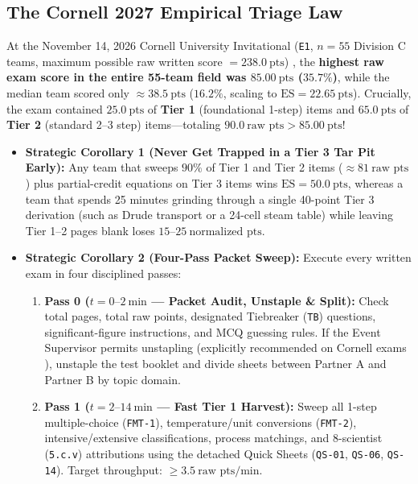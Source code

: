 \subsection{The Cornell 2027 Empirical Triage Law}
At the November 14, 2026 Cornell University Invitational (\texttt{E1}, $n=55$ Division C teams, maximum possible raw written score $= \SI{238.0}{\text{pts}}$) , the \textbf{highest raw exam score in the entire 55-team field was $\SI{85.00}{\text{pts}}$ ($35.7\%$)}, while the median team scored only $\approx \SI{38.5}{\text{pts}}$ ($16.2\%$, scaling to $\mathrm{ES} = \SI{22.65}{\text{pts}}$). Crucially, the exam contained $\SI{25.0}{\text{pts}}$ of \textbf{Tier 1} (foundational 1-step) items and $\SI{65.0}{\text{pts}}$ of \textbf{Tier 2} (standard 2--3 step) items---totaling \textbf{$\SI{90.0}{\text{raw pts}} > \SI{85.00}{\text{pts}}$}!
\begin{itemize}
  \item \textbf{Strategic Corollary 1 (Never Get Trapped in a Tier 3 Tar Pit Early):} Any team that sweeps $90\%$ of Tier 1 and Tier 2 items ($\approx \SI{81}{\text{raw pts}}$) plus partial-credit equations on Tier 3 items wins $\mathrm{ES} = \SI{50.0}{\text{pts}}$, whereas a team that spends 25 minutes grinding through a single 40-point Tier 3 derivation (such as Drude transport or a 24-cell steam table) while leaving Tier 1--2 pages blank loses $15\text{--}\SI{25}{\text{normalized pts}}$.
  \item \textbf{Strategic Corollary 2 (Four-Pass Packet Sweep):} Execute every written exam in four disciplined passes:
  \begin{enumerate}
    \item \textbf{Pass 0 ($t = 0\text{--}\SI{2}{\minute}$ --- Packet Audit, Unstaple \& Split):} Check total pages, total raw points, designated Tiebreaker (\texttt{TB}) questions, significant-figure instructions, and MCQ guessing rules. If the Event Supervisor permits unstapling (explicitly recommended on Cornell exams ), unstaple the test booklet and divide sheets between Partner A and Partner B by topic domain.
    \item \textbf{Pass 1 ($t = 2\text{--}\SI{14}{\minute}$ --- Fast Tier 1 Harvest):} Sweep all 1-step multiple-choice (\texttt{FMT-1}), temperature/unit conversions (\texttt{FMT-2}), intensive/extensive classifications, process matchings, and 8-scientist (\texttt{5.c.v}) attributions using the detached  Quick Sheets (\texttt{QS-01}, \texttt{QS-06}, \texttt{QS-14}). Target throughput: $\ge \SI{3.5}{\text{raw pts/min}}$.

\end{enumerate}
\end{itemize}
